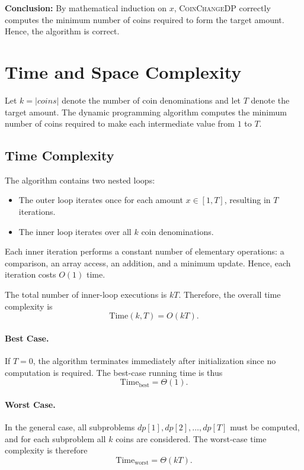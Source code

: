 \documentclass[12pt,a4paper]{report}
\begin{document}
\medskip

\textbf{Conclusion:}  
By mathematical induction on $x$, \textsc{CoinChangeDP} correctly computes the minimum number of coins required to form the target amount. Hence, the algorithm is correct.

\section{Time and Space Complexity}

Let $k = |coins|$ denote the number of coin denominations and let $T$ denote the target amount.
The dynamic programming algorithm computes the minimum number of coins required to make each intermediate value from $1$ to $T$.

\subsection{Time Complexity}

The algorithm contains two nested loops:

\begin{itemize}
    \item The outer loop iterates once for each amount $x \in [1, T]$, resulting in $T$ iterations.
    \item The inner loop iterates over all $k$ coin denominations.
\end{itemize}

Each inner iteration performs a constant number of elementary operations:
a comparison, an array access, an addition, and a minimum update.
Hence, each iteration costs $O(1)$ time.

The total number of inner-loop executions is $kT$.
Therefore, the overall time complexity is
\[
\text{Time}(k, T) = O(kT).
\]

\paragraph{Best Case.}
If $T = 0$, the algorithm terminates immediately after initialization since no computation is required.
The best-case running time is thus
\[
\text{Time}_{\text{best}} = \Theta(1).
\]

\paragraph{Worst Case.}
In the general case, all subproblems $dp[1], dp[2], \ldots, dp[T]$ must be computed,
and for each subproblem all $k$ coins are considered.
The worst-case time complexity is therefore
\[
\text{Time}_{\text{worst}} = \Theta(kT).
\]
\end{document}

